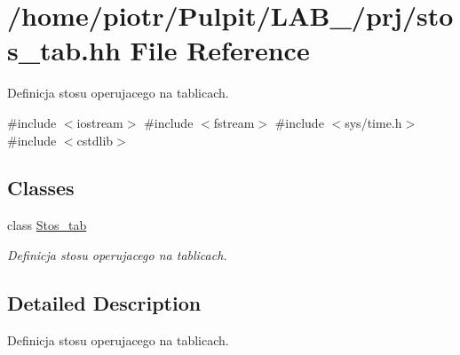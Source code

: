 \hypertarget{stos__tab_8hh}{\section{/home/piotr/\-Pulpit/\-L\-A\-B\-\_/prj/stos\-\_\-tab.hh \-File \-Reference}
\label{stos__tab_8hh}
}


\-Definicja stosu operujacego na tablicach.  


{\ttfamily \#include $<$iostream$>$}\*
{\ttfamily \#include $<$fstream$>$}\*
{\ttfamily \#include $<$sys/time.\-h$>$}\*
{\ttfamily \#include $<$cstdlib$>$}\*
\subsection*{\-Classes}
\begin{DoxyCompactItemize}
\item 
class \hyperlink{class_stos__tab}{\-Stos\-\_\-tab}
\begin{DoxyCompactList}\small\item\em \-Definicja stosu operujacego na tablicach. \end{DoxyCompactList}\end{DoxyCompactItemize}


\subsection{\-Detailed \-Description}
\-Definicja stosu operujacego na tablicach. 